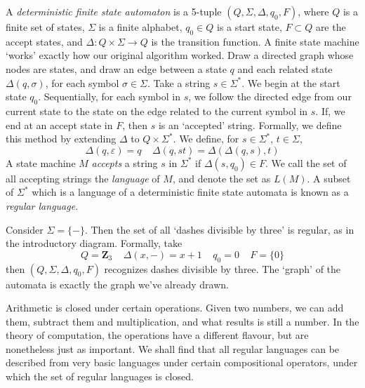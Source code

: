 A \emph{deterministic finite state automaton} is a 5-tuple $(Q, \Sigma, \Delta, q_0, F)$, where $Q$ is a finite set of states, $\Sigma$ is a finite alphabet, $q_0 \in Q$ is a start state, $F \subset Q$ are the accept states, and $\Delta: Q \times \Sigma \to Q$ is the transition function. A finite state machine `works' exactly how our original algorithm worked. Draw a directed graph whose nodes are states, and draw an edge between a state $q$ and each related state $\Delta(q, \sigma)$, for each symbol $\sigma \in \Sigma$. Take a string $s \in \Sigma^*$. We begin at the start state $q_0$. Sequentially, for each symbol in $s$, we follow the directed edge from our current state to the state on the edge related to the current symbol in $s$. If, we end at an accept state in $F$, then $s$ is an `accepted' string. Formally, we define this method by extending $\Delta$ to $Q \times \Sigma^*$. We define, for $s \in \Sigma^*$, $t \in \Sigma$,
%
\[ \Delta(q, \varepsilon) = q\ \ \ \ \ \Delta(q, st) = \Delta(\Delta(q,s), t) \]
%
A state machine $M$ \emph{accepts} a string $s$ in $\Sigma^*$ if $\Delta(s,q_0) \in F$. We call the set of all accepting strings the \emph{language} of $M$, and denote the set as $L(M)$. A subset of $\Sigma^*$ which is a language of a deterministic finite state automata is known as a \emph{regular language}.

\begin{example}
    Consider $\Sigma = \{ - \}$. Then the set of all `dashes divisible by three' is regular, as in the introductory diagram. Formally, take
    \[ Q = \mathbf{Z}_3\ \ \ \ \ \Delta(x,-) = x+1\ \ \ \ \ q_0 = 0\ \ \ \ \ F = \{ 0 \} \]
    then $(Q, \Sigma, \Delta, q_0, F)$ recognizes dashes divisible by three. The `graph' of the automata is exactly the graph we've already drawn.
\end{example}

Arithmetic is closed under certain operations. Given two numbers, we can add them, subtract them and multiplication, and what results is still a number. In the theory of computation, the operations have a different flavour, but are nonetheless just as important. We shall find that all regular languages can be described from very basic languages under certain compositional operators, under which the set of regular languages is closed.

